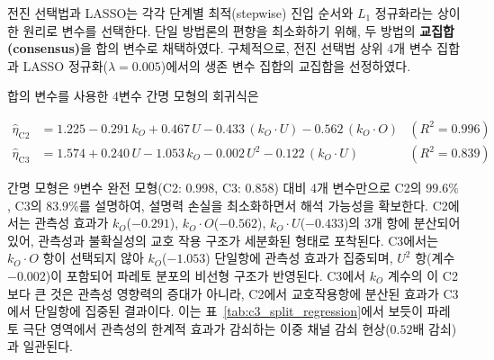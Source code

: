  전진 선택법과 LASSO는 각각 단계별 최적(stepwise) 진입 순서와
$L_1$ 정규화라는 상이한 원리로 변수를 선택한다.
단일 방법론의 편향을 최소화하기 위해, 두 방법의
\textbf{교집합(consensus)}을 합의 변수로 채택하였다.
구체적으로, 전진 선택법 상위 4개 변수 집합과
LASSO 정규화($\lambda = 0.005$)에서의 생존 변수 집합의
교집합을 선정하였다.


합의 변수를 사용한 4변수 간명 모형의 회귀식은 

\begin{align}
  \hat{\eta}_{\text{C2}} &= 1.225
    - 0.291\,k_O + 0.467\,U
    - 0.433\,(k_O \cdot U) - 0.562\,(k_O \cdot O)
    & (R^2 = 0.996) \label{eq:c2_parsimonious} \\
  \hat{\eta}_{\text{C3}} &= 1.574
    + 0.240\,U - 1.053\,k_O
    - 0.002\,U^2 - 0.122\,(k_O \cdot U)
    & (R^2 = 0.839) \label{eq:c3_parsimonious}
\end{align}

간명 모형은 9변수 완전 모형(C2: $0.998$, C3: $0.858$) 대비
4개 변수만으로 C2의 $99.6\%$, C3의 $83.9\%$를 설명하여,
설명력 손실을 최소화하면서 해석 가능성을 확보한다.
C2에서는 관측성 효과가 $k_O$($-0.291$), $k_O \cdot O$($-0.562$),
$k_O \cdot U$($-0.433$)의 3개 항에 분산되어 있어,
관측성과 불확실성의 교호 작용 구조가 세분화된 형태로 포착된다.
C3에서는 $k_O \cdot O$ 항이 선택되지 않아 $k_O$($-1.053$) 단일항에
관측성 효과가 집중되며, $U^2$ 항(계수 $-0.002$)이 포함되어
파레토 분포의 비선형 구조가 반영된다.
C3에서 $k_O$ 계수의 이 C2보다 큰 것은 관측성 영향력의 증대가
아니라, C2에서 교호작용항에 분산된 효과가 C3에서 단일항에
집중된 결과이다.
이는 \p{[}표~\vref{tab:c3_split_regression}\p{]}에서 보듯이 파레토 극단 영역에서 관측성의 한계적 효과가 감쇠하는
이중 채널 감쇠 현상($0.52$배 감쇠)과 일관된다.

\subsection{}
\label{subsec:ch4_h4_h5_conclusion}

